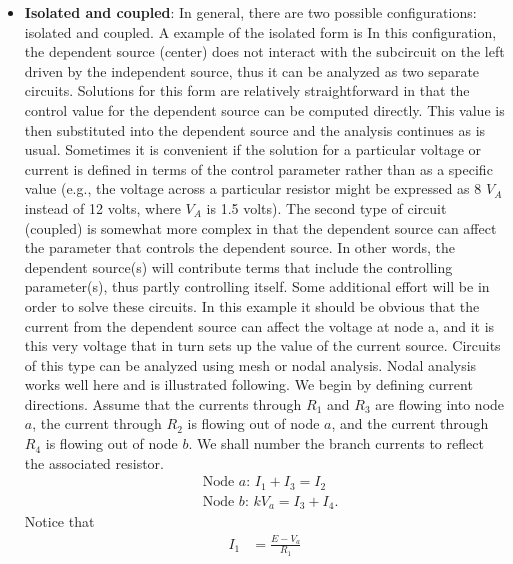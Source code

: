 \documentclass{report}
\begin{document}
\begin{itemize}
        \item \textbf{Isolated and coupled}: In general, there are two possible configurations: isolated and coupled. A example of the isolated form is
            \bigbreak \noindent 
            \bigbreak \noindent 
            In this configuration, the dependent source (center) does not interact with the subcircuit on the left driven by the independent source, thus it can be analyzed as two separate circuits. Solutions for this form are relatively straightforward in that the control value for the dependent source can be computed directly. This value is then substituted into the dependent source and the analysis continues as is usual. Sometimes it is convenient if the solution for a particular voltage or current is defined in terms of the control parameter rather than as a specific value (e.g., the voltage across a particular resistor might be expressed as 8 $V_{A}$ instead of 12 volts, where $V_{A}$ is 1.5 volts).
            \bigbreak \noindent 
            The second type of circuit (coupled) is somewhat more complex in that the dependent source can affect the parameter that controls the dependent source. In other words, the dependent source(s) will contribute terms that include the controlling parameter(s), thus partly controlling itself. Some additional effort will be in order to solve these circuits.
            \bigbreak \noindent 
            \bigbreak \noindent 
            In this example it should be obvious that the current from the dependent source can affect the voltage at node a, and it is this very voltage that in turn sets up the value of the current source. Circuits of this type can be analyzed using mesh or nodal analysis. Nodal analysis works well here and is illustrated following.
            \bigbreak \noindent 
            We begin by defining current directions. Assume that the currents through $R_1$ and $R_3$ are flowing into node $a$, the current through $R_2$ is flowing out of node $a$, and the current through $R_4$ is flowing out of node $b$. We shall number the branch currents to reflect the associated resistor.
            \begin{align*}
                &\text{Node $a$: } I_{1} + I_{3} = I_{2} \\
                &\text{Node $b$: } kV_{a} = I_{3} + I_{4}
            .\end{align*}
            Notice that 
            \begin{align*}
                I_{1} &= \frac{E - V_{a}}{R_{1}} \\

\end{align*}
\end{itemize}
\end{document}
